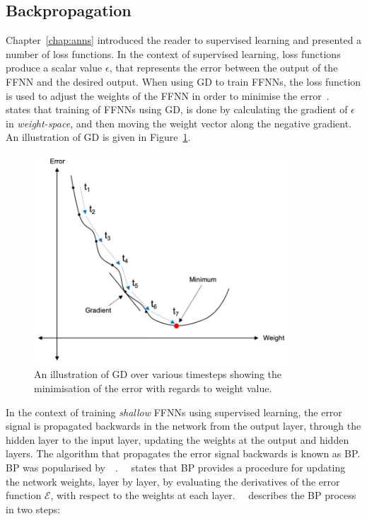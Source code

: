 \subsection{Backpropagation}\label{sec:heuristics:gd:backpropagation}

Chapter~\ref{chap:anns} introduced the reader to supervised learning and presented a number of loss functions. In the context of supervised learning, loss functions produce a scalar value $\epsilon$, that represents the error between the output of the \acs{FFNN} and the desired output. When using \acs{GD} to train \acp{FFNN}, the loss function is used to adjust the weights of the \acs{FFNN} in order to minimise the error~\cite{ref:engelbrecht:2007}.~\citeauthor{ref:engelbrecht:2007}~\cite{ref:engelbrecht:2007} states that training of \acp{FFNN} using \acs{GD}, is done by calculating the gradient of $\epsilon$ in \textit{weight-space}, and then moving the weight vector along the negative gradient. An illustration of \acs{GD} is given in Figure~\ref{fig:heuristics:gd:gd_illustration}.

\begin{figure}[htbp]
      \centering
      \includegraphics[width=0.85\textwidth]{images/gradient_descent.pdf}
      \caption{An illustration of \acf{GD} over various timesteps showing the minimisation of the error with regards to weight value.}
      \label{fig:heuristics:gd:gd_illustration}
\end{figure}

\noindent
In the context of training \textit{shallow} \acp{FFNN} using supervised learning, the error signal is propagated backwards in the network from the output layer, through the hidden layer to the input layer, updating the weights at the output and hidden layers. The algorithm that propagates the error signal backwards is known as \acf{BP}. \Acs{BP} was popularised by~\citeauthor{ref:werbos:1994}~\cite{ref:werbos:1994}.~\citeauthor{ref:nel:2021}~\cite{ref:nel:2021} states that \acs{BP} provides a procedure for updating the network weights, layer by layer, by evaluating the derivatives of the error function $\mathcal{E}$, with respect to the weights at each layer.~\citeauthor{ref:engelbrecht:2007}~\cite{ref:engelbrecht:2007} describes the \acs{BP} process in two steps:


